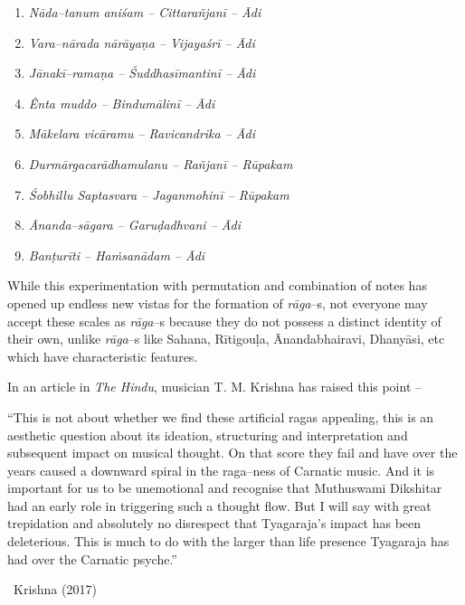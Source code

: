 \begin{enumerate}
\item \textit{Nāda–tanum aniśam – Cittarañjanī – Ādi}

 \item \textit{Vara–nārada nārāyaṇa – Vijayaśrī – Ādi}

 \item \textit{Jānakī–ramaṇa – Śuddhasīmantinī – Ādi} 

 \item \textit{Ênta muddo – Bindumālinī – Ādi}

 \item \textit{Mākelara vicāramu – Ravicandrika – Ādi}

 \item \textit{Durmārgacarādhamulanu – Rañjanī – Rūpakam}

 \item \textit{Śobhillu Saptasvara – Jaganmohinī – Rūpakam}

 \item \textit{Ānanda–sāgara – Garuḍadhvani – Ādi}

 \item \textit{Banṭurīti – Haṁsanādam – Ādi}

\end{enumerate}

While this experimentation with permutation and combination of notes has opened up endless new vistas for the formation of \textit{rāga}–s, not everyone may accept these scales as \textit{rāga}–s because they do not possess a distinct identity of their own, unlike \textit{rāga}–s like Sahana, Rītigouḷa, Ānandabhairavi, Dhanyāsi, etc which have characteristic features.

In an article in \textit{The Hindu}, musician T. M. Krishna has raised this point –

\begin{myquote}
“This is not about whether we find these artificial ragas appealing, this is an aesthetic question about its ideation, structuring and interpretation and subsequent impact on musical thought. On that score they fail and have over the years caused a downward spiral in the raga–ness of Carnatic music. And it is important for us to be unemotional and recognise that Muthuswami Dikshitar had an early role in triggering such a thought flow. But I will say with great trepidation and absolutely no disrespect that Tyagaraja’s impact has been deleterious. This is much to do with the larger than life presence Tyagaraja has had over the Carnatic psyche.” 

~\hfill Krishna (2017)
\end{myquote}

